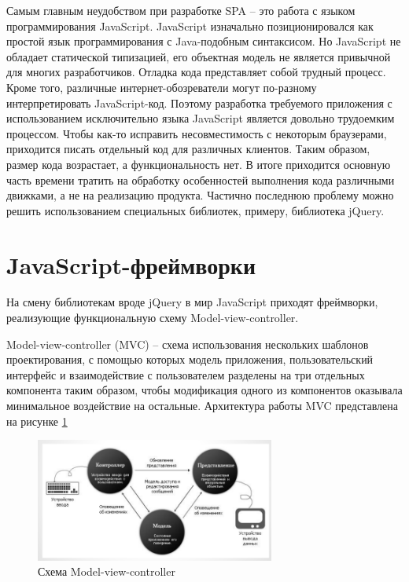 Самым главным неудобством при разработке SPA -- это работа с языком программирования JavaScript. JavaScript изначально позиционировался как простой язык программирования с Java-подобным синтаксисом. Но  JavaScript не обладает статической типизацией, его объектная модель не является привычной для многих разработчиков. Отладка кода представляет собой трудный процесс. Кроме того, различные интернет-обозреватели могут по-разному интерпретировать JavaScript-код. Поэтому разработка требуемого приложения с использованием исключительно языка JavaScript является довольно трудоемким процессом. Чтобы как-то исправить несовместимость с некоторым браузерами, приходится писать отдельный код для различных клиентов. Таким образом, размер кода возрастает, а функциональность нет. В итоге приходится основную часть времени тратить на обработку особенностей выполнения кода различными движками, а не на реализацию продукта. Частично последнюю проблему можно решить использованием специальных библиотек, примеру, библиотека jQuery.  


\section {JavaScript-фреймворки}

На смену библиотекам вроде jQuery в мир JavaScript приходят фреймворки, реализующие функциональную схему Model-view-controller. 

Model-view-controller (MVC) -- схема использования нескольких шаблонов проектирования, с помощью которых модель приложения, пользовательский интерфейс и взаимодействие с пользователем разделены на три отдельных компонента таким образом, чтобы модификация одного из компонентов оказывала минимальное воздействие на остальные. Архитектура работы MVC представлена на рисунке \ref{mvc}

\begin{figure}[ht]

\center\includegraphics[width=0.7\textwidth]{mvc}

\caption{Схема Model-view-controller}\label{mvc}

\end{figure}

